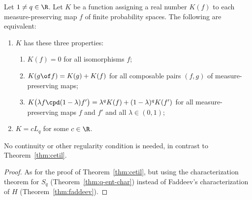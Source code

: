 \begin{thm}
%
%
%
%
%
Let $1 \neq q \in \R$.  Let $K$ be a function assigning a real number
$K(f)$ to each measure-preserving map $f$ of finite probability spaces.
The following are equivalent:
% 
\begin{enumerate}
\item 
{}
$K$ has these three properties:
% 
\begin{enumerate}
\item 
$K(f) = 0$ for all isomorphisms $f$;

\item
$K(g \of f) = K(g) + K(f)$ for all composable pairs $(f, g)$ of
  measure-preserving maps;

\item
$K\bigl(\lambda f \cpd (1 - \lambda) f'\bigr) = \lambda^q K(f) + (1 -
  \lambda)^q K(f')$ for all measure-preserving maps $f$ and $f'$ and all
  $\lambda \in (0, 1)$;
\end{enumerate}

\item
{}
$K = cL_q$ for some $c \in \R$.
\end{enumerate}
\end{thm}

No continuity or other regularity condition is needed, in contrast to
Theorem~\ref{thm:cetil}. 

\begin{proof}
As for the proof of Theorem~\ref{thm:cetil}, but using the characterization
theorem for $S_q$ (Theorem~\ref{thm:q-ent-char}) instead of Faddeev's
characterization of $H$ (Theorem~\ref{thm:faddeev}).
\end{proof}


